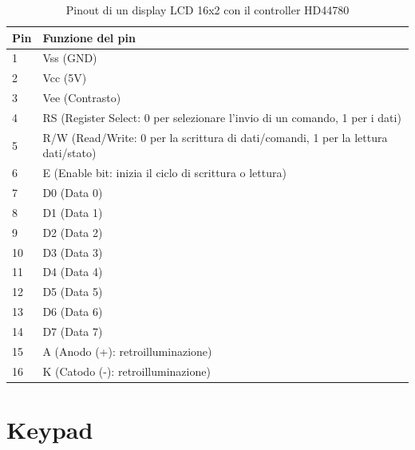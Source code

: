 \documentclass[12pt]{report}
\begin{document}
\begin{table}[H]
	\begin{center}
		\begin{tabular}{l|l} 
			\textbf{Pin} & \textbf{Funzione del pin} \\
			\hline
			1 & Vss (GND) \\
			2 & Vcc (5V) \\ 
			3 & Vee (Contrasto) \\
			4 & RS (Register Select: 0 per selezionare l'invio di un comando, 1 per i dati) \\
			5 & R/W (Read/Write: 0 per la scrittura di dati/comandi, 1 per la lettura dati/stato) \\
			6 & E (Enable bit: inizia il ciclo di scrittura o lettura) \\
			7 & D0 (Data 0) \\
			8 & D1 (Data 1) \\
			9 & D2 (Data 2) \\
			10 & D3 (Data 3) \\
			11 & D4 (Data 4) \\
			12 & D5 (Data 5) \\
			13 & D6 (Data 6) \\
			14 & D7 (Data 7) \\
			15 & A (Anodo (+): retroilluminazione) \\
			16 & K (Catodo (-): retroilluminazione) \\
		\end{tabular}
	\caption{Pinout di un display LCD 16x2 con il controller HD44780}
	\label{tab:lcd_pinout}
	\end{center}
\end{table}

%
\section{Keypad}
%
\end{document}
